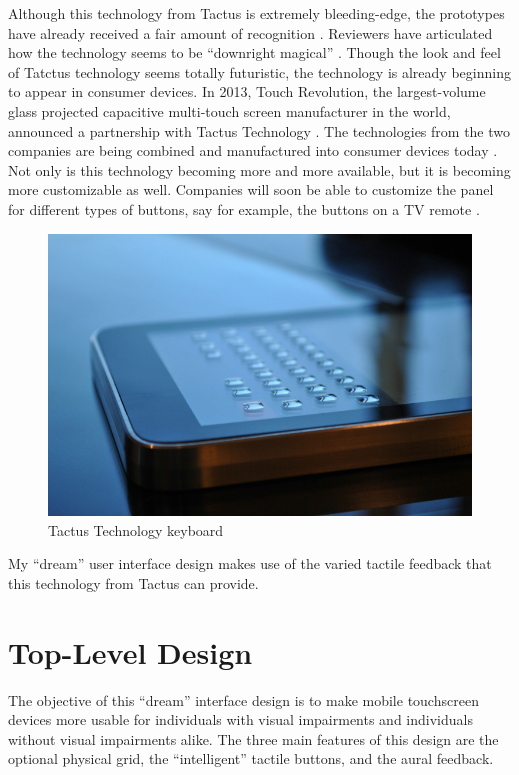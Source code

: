 \documentclass[11pt]{article}
\begin{document}
Although this technology from Tactus is extremely bleeding-edge, the prototypes have already received a fair amount of recognition \cite{CNN, I-Zone, PCMag, Wired}. Reviewers have articulated how the technology seems to be ``downright magical'' \cite{CNN}. Though the look and feel of Tatctus technology seems totally futuristic, the technology is already beginning to appear in consumer devices. In 2013, Touch Revolution, the largest-volume glass projected capacitive multi-touch screen manufacturer in the world, announced a partnership with Tactus Technology \cite{TactusAvailability}. The technologies from the two companies are being combined and manufactured into consumer devices today \cite{TactusAvailability}. Not only is this technology becoming more and more available, but it is becoming more customizable as well. Companies will soon be able to customize the panel for different types of buttons, say for example, the buttons on a TV remote \cite{CNN}.

\begin{figure}[ht]
\centering
\includegraphics[width=4.5in]{tactus2.jpg} 
\caption{Tactus Technology keyboard}
\label{tactus1}
\end{figure}

My ``dream'' user interface design makes use of the varied tactile feedback that this technology from Tactus can provide.


\section{Top-Level Design}
The objective of this ``dream'' interface design is to make mobile touchscreen devices more usable for individuals with visual impairments and individuals without visual impairments alike. The three main features of this design are the optional physical grid, the ``intelligent'' tactile buttons, and the aural feedback. 
\end{document}
